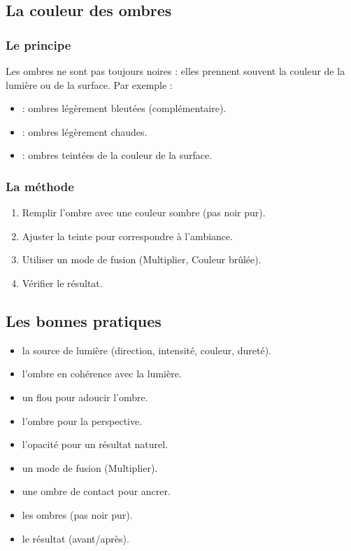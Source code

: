 \subsection{La couleur des ombres}

\subsubsection{Le principe}

Les ombres ne sont pas toujours noires : elles prennent souvent la couleur de la lumière ou de la surface. Par exemple :

\begin{itemize}
    \item {} : ombres légèrement bleutées (complémentaire).
    \item {} : ombres légèrement chaudes.
    \item {} : ombres teintées de la couleur de la surface.
\end{itemize}

\subsubsection{La méthode}

\begin{enumerate}
    \item Remplir l'ombre avec une couleur sombre (pas noir pur).
    \item Ajuster la teinte pour correspondre à l'ambiance.
    \item Utiliser un mode de fusion (Multiplier, Couleur brûlée).
    \item Vérifier le résultat.
\end{enumerate}

\subsection{Les bonnes pratiques}

\begin{itemize}
    \item {} la source de lumière (direction, intensité, couleur, dureté).
    \item {} l'ombre en cohérence avec la lumière.
    \item {} un flou pour adoucir l'ombre.
    \item {} l'ombre pour la perspective.
    \item {} l'opacité pour un résultat naturel.
    \item {} un mode de fusion (Multiplier).
    \item {} une ombre de contact pour ancrer.
    \item {} les ombres (pas noir pur).
    \item {} le résultat (avant/après).
\end{itemize}

